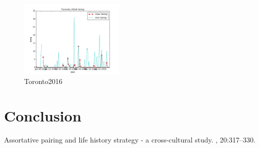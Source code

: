 \documentclass[DIV=calc, paper=a4, fontsize=11pt, twocolumn]{scrartcl}
\begin{document}
\begin{figure}[h!]
	\centering
	\includegraphics[width=50mm]{../output/plot_images/Toronto_2016.png}
	\caption{Toronto2016}
	\label{fig:method6}
\end{figure}


\section{Conclusion}

\begin{thebibliography}{99}
\newblock Assortative pairing and life history strategy - a cross-cultural
  study.
, 20:317--330.
 \end{thebibliography}
\end{document}
